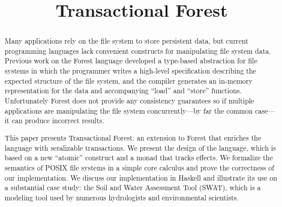\documentclass[nocopyrightspace]{sigplanconf}
\title{Transactional Forest}
\begin{document}
\maketitle


\begin{abstract}
Many applications rely on the file system to store persistent data,
but current programming languages lack convenient constructs for
manipulating file system data. Previous work on the Forest language
developed a type-based abstraction for file systems in which the
programmer writes a high-level specification describing the expected
structure of the file system, and the compiler generates an in-memory
representation for the data and accompanying ``load'' and ``store''
functions. Unfortunately Forest does not provide any consistency
guarantees so if multiple applications are manipulating the file
system concurrently---by far the common case---it can produce
incorrect results.

This paper presents Transactional Forest: an extension to Forest that
enriches the language with seralizable transactions. We present the
design of the language, which is based on a new ``atomic'' construct
and a monad that tracks effects. We formalize the semantics of POSIX
file systems in a simple core calculus and prove the correctness of
our implementation. We discuss our implementation in Haskell and
illustrate its use on a substantial case study: the Soil and Water
Assessment Tool (SWAT), which is a modeling tool used by numerous
hydrologists and environmental scientists.
\end{abstract}
\end{document}
